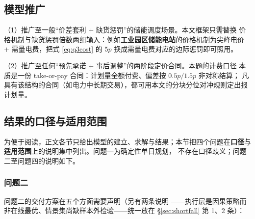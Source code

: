 \documentclass[withoutpreface]{cumcmthesis}
\renewcommand{\emph}[1]{\textbf{#1}}
\begin{document}
\subsection{模型推广}

\noindent（1）推广至一般“价差套利 $+$ 缺货惩罚”的储能调度场景。本文框架只需替换
价格机制与缺货惩罚倍数两组输入：例如\emph{工业园区储能电站}的价格机制为尖峰电价
$+$ 需量电费，把式 \eqref{eq:q3cost} 的 $5p$ 换成需量电费对应的边际惩罚即可照用。

\noindent（2）推广至任何“预先承诺 $+$ 事后调整”的两阶段定价合同。本题的计费口径
本质是一份 take-or-pay 合同：计划量全额付费、偏差按 $0.5p/1.5p$ 非对称结算；
凡具有该结构的合同（如电力中长期交易），都可用本文的分块分位对冲规则定出报计划量。

\subsection{结果的口径与适用范围}
\label{sec:scope}

\noindent 为便于阅读，正文各节只给出模型的建立、求解与结果；本节把四个问题在\emph{口径}与\emph{适用范围}上的说明集中列出。问题一为确定性单日规划，
不存在口径歧义；问题二至问题四的说明如下。

\subsubsection{问题二}

\noindent 问题二的交付方案在五个方面需要声明（另有两条说明
——执行层是因果策略而非在线最优、情景集尚缺样本外检验——统一放在
\S\ref{sec:shortfall} 第 1、2 条）：
\end{document}
